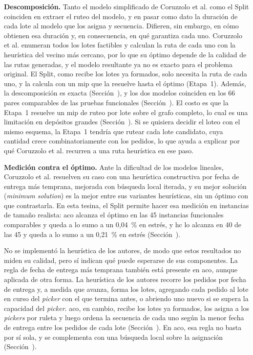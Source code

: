 {\bf Descomposición.} Tanto el modelo simplificado de Coruzzolo
et al. como el Split coinciden en extraer el ruteo del modelo, y en
pasar como dato la duración de cada lote al modelo que los asigna y secuencia.
Difieren, sin embargo, en cómo obtienen esa duración y, en consecuencia, en qué garantiza cada uno.
Coruzzolo et al.
enumeran todos los lotes factibles y calculan la ruta de cada uno con la
heurística del vecino más cercano, por lo que su óptimo depende de la calidad de las
rutas generadas, y el modelo resultante ya no es exacto para el problema original. El Split, como recibe los
lotes ya formados, solo necesita la ruta de cada uno, y la calcula con un \ac{mip}
que la resuelve hasta el óptimo (Etapa~1). Además, la descomposición es exacta
(Sección~), y los dos modelos coinciden en los 66 pares
comparables de las pruebas funcionales (Sección~). El costo es que la Etapa~1
resuelve un \ac{mip} de ruteo por lote sobre el grafo completo, lo cual es una limitación
en depósitos grandes (Sección~).
Si se quisiera decidir el loteo con el mismo esquema, la Etapa~1 tendría que
rutear cada lote candidato, cuya cantidad crece combinatoriamente con los
pedidos, lo que ayuda a explicar por qué Coruzzolo et al. recurren a una ruta
heurística en ese paso.

{\bf Medición contra el óptimo.} Ante la dificultad de los modelos lineales,
Coruzzolo et al. resuelven su caso con una heurística constructiva
por fecha de entrega más temprana, mejorada con búsqueda local iterada, y su
mejor solución ({\em minimum solution}) es la mejor entre sus variantes
heurísticas, sin un óptimo con que contrastarla. En esta tesina, el Split
permite hacer esa medición en instancias de tamaño realista: \ac{aco} alcanza
el óptimo en las 45 instancias funcionales comparables y queda a lo sumo a un
0,04~\% en estrés, y \ac{hc} lo alcanza en 40 de las 45 y queda a lo sumo a un
0,21~\% en estrés (Sección~).

No se implementó la heurística de los autores,
de modo que estos resultados no miden su calidad, pero sí
indican qué puede esperarse de sus componentes. La regla de fecha de entrega
más temprana también está presente en \ac{aco}, aunque aplicada de otra
forma. La heurística de los autores recorre los pedidos por fecha de entrega
y, a medida que avanza, forma los lotes, agregando cada pedido al lote en curso
del {\em picker} con el que termina antes, o abriendo uno nuevo si se supera la
capacidad del {\em picker}. \ac{aco}, en cambio, recibe los lotes ya formados, los
asigna a los {\em pickers} por ruleta y luego ordena la secuencia de cada uno
según la menor fecha de entrega entre los pedidos de cada lote
(Sección~). En \ac{aco}, esa regla no basta por sí
sola, y se complementa con una búsqueda local sobre la asignación
(Sección~).


